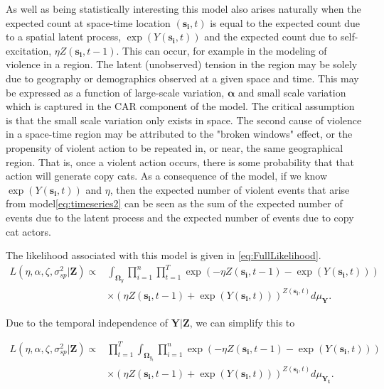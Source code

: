\documentclass[11pt]{isuthesis}
\begin{document}
	As well as being statistically interesting this model also arises naturally when the expected count at space-time location $(\boldsymbol{s_i},t)$ is equal to the expected count due to a spatial latent process, $\exp(Y(\boldsymbol{s_i},t))$ and the expected count due to self-excitation, $\eta Z(\boldsymbol{s_i},t-1)$. This can occur, for example in the modeling of violence in a region.  The latent (unobserved) tension in the region may be solely due to geography or demographics observed at a given space and time.  This may be expressed as a function of large-scale variation, $\boldsymbol{\alpha}$ and small scale variation which is captured in the CAR component of the model.  The critical assumption is that the small scale variation only exists in space.  The second cause of violence in a space-time region may be attributed to the "broken windows" effect, or the propensity of violent action to be repeated in, or near, the same geographical region.  That is, once a violent action occurs, there is some probability that that action will generate copy cats.  As a consequence of the model, if we know $\exp(Y(\boldsymbol{s_i},t))$ and $\eta$, then the expected number of violent events that arise from model\eqref{eq:timeseries2} can be seen as the sum of the expected number of events due to the latent process and the expected number of events due to copy cat actors.
	
	The likelihood associated with this model is given in \eqref{eq:FullLikelihood}.
	\begin{align}
	L(\eta,\alpha,\zeta,\sigma_{sp}^2|\boldsymbol{Z}) \propto & \int_{\boldsymbol{\Omega}_y} \prod_{i=1}^{n}\prod_{t=1}^{T} \exp(-\eta Z(\boldsymbol{s_i},t-1)-\exp(Y(\boldsymbol{s_i},t)))\nonumber\\
	&\times \left(\eta Z(\boldsymbol{s_i},t-1)+\exp(Y(\boldsymbol{s_i},t))\right)^{Z(\boldsymbol{s_i},t)} d\mu_{\boldsymbol{Y}}\label{eq:FullLikelihood}.
	\end{align}
	
	Due to the temporal independence of $\boldsymbol{Y}|\boldsymbol{Z}$, we can simplify this to
	
	\begin{align}
	L(\eta,\alpha,\zeta,\sigma_{sp}^2|\boldsymbol{Z}) \propto & \prod_{t=1}^{T}\int_{\boldsymbol{\Omega}_{y_t}} \prod_{i=1}^{n} \exp(-\eta Z(\boldsymbol{s_i},t-1)-\exp(Y(\boldsymbol{s_i},t)))\nonumber\\
	&\times \left(\eta Z(\boldsymbol{s_i},t-1)+\exp(Y(\boldsymbol{s_i},t))\right)^{Z(\boldsymbol{s_i},t)} d\mu_{\boldsymbol{Y_t}}\label{eq:FullLikelihood2}.
	\end{align}
	
\end{document}

